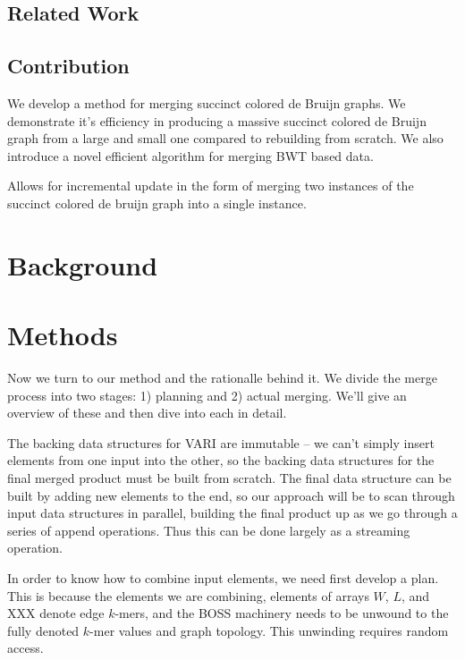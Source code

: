 \documentclass[doctor]{thesis}
\begin{document}
\subsection{Related Work}

\subsection{Contribution}

We develop a method for merging succinct colored de Bruijn graphs.  We demonstrate it's efficiency in producing a massive succinct colored de Bruijn graph from a large and small one compared to rebuilding from scratch.  We also introduce a novel efficient algorithm for merging BWT based data.

Allows for incremental update in the form of merging two instances of the succinct colored de bruijn graph into a single instance.
 


\makeatletter{}\section{Background}
 


\makeatletter{}\section{Methods}

Now we turn to our method and the rationalle behind it.  We divide the merge process into two stages: 1) planning and 2) actual merging.  We'll give an overview of these and then dive into each in detail.

The backing data structures for VARI are immutable -- we can't simply insert elements from one input into the other, so the backing data structures for the final merged product must be built from scratch. The final data structure can be built by adding new elements to the end, so our approach will be to scan through input data structures in parallel, building the final product up as we go through a series of append operations.  Thus this can be done largely as a streaming operation.

In order to know how to combine input elements, we need first develop a plan.  This is because the elements we are combining, elements of arrays $W$, $L$, and XXX denote edge $k$-mers, and the BOSS machinery needs to be unwound to the fully denoted $k$-mer values and graph topology.  This unwinding requires random access.
\end{document}
